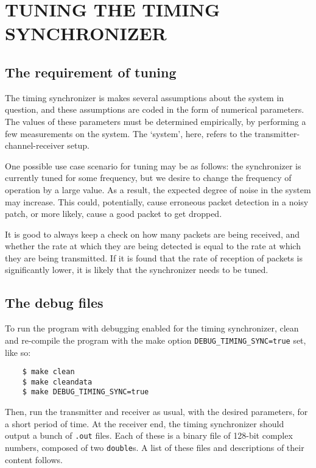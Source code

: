 \appendix

\chapter{TUNING THE TIMING SYNCHRONIZER}

\section{The requirement of tuning}

The timing synchronizer is makes several assumptions about the system in
question, and these assumptions are coded in the form of numerical parameters.
The values of these parameters must be determined empirically, by performing a
few measurements on the system. The `system', here, refers to the
transmitter-channel-receiver setup.

One possible use case scenario for tuning may be as follows: the synchronizer
is currently tuned for some frequency, but we desire to change the frequency of
operation by a large value. As a result, the expected degree of noise in the
system may increase. This could, potentially, cause erroneous packet detection
in a noisy patch, or more likely, cause a good packet to get dropped.

It is good to always keep a check on how many packets are being received, and
whether the rate at which they are being detected is equal to the rate at which
they are being transmitted. If it is found that the rate of reception of
packets is significantly lower, it is likely that the synchronizer needs to be
tuned.


\section{The debug files}

To run the program with debugging enabled for the timing synchronizer, clean
and re-compile the program with the make option \verb!DEBUG_TIMING_SYNC=true!
set, like so:
\lstset{language=}
\begin{lstlisting}
	$ make clean
	$ make cleandata
	$ make DEBUG_TIMING_SYNC=true
\end{lstlisting}
\lstset{language=C++}

Then, run the transmitter and receiver as usual, with the desired parameters,
for a short period of time. At the receiver end, the timing synchronizer should
output a bunch of \texttt{.out} files. Each of these is a binary file of
128-bit complex numbers, composed of two \lstinline!double!s. A list of these
files and descriptions of their content follows.

